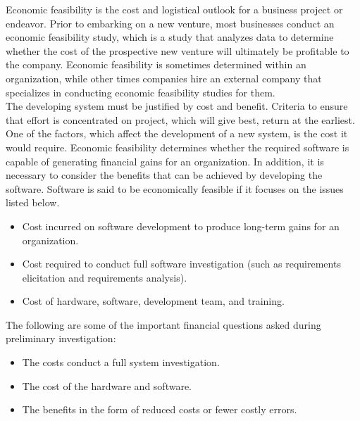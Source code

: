 Economic feasibility is the cost and logistical outlook for a business project or endeavor. Prior to embarking on a new venture, most businesses conduct an economic feasibility study, which is a study that analyzes data to determine whether the cost of the prospective new venture will ultimately be profitable to the company. Economic feasibility is sometimes determined within an organization, while other times companies hire an external company that specializes in conducting economic feasibility studies for them.\\
The developing system must be justified by cost and benefit. Criteria to ensure that effort is concentrated on project, which will give best, return at the earliest. One of the factors, which affect the development of a new system, is the cost it would require. Economic feasibility determines whether the required software is capable of generating financial gains for an organization. In addition, it is necessary to consider the benefits that can be achieved by developing the software. Software is said to be economically feasible if it focuses on the issues listed below.
\begin{itemize}
	\item Cost incurred on software development to produce long-term gains for an organization.
	\item Cost required to conduct full software investigation (such as requirements elicitation and requirements analysis).
	\item Cost of hardware, software, development team, and training.
\end{itemize}

The following are some of the important financial questions asked during preliminary investigation:
\begin{itemize}
	\item The costs conduct a full system investigation.
	\item The cost of the hardware and software.
	\item The benefits in the form of reduced costs or fewer costly errors.
\end{itemize}

